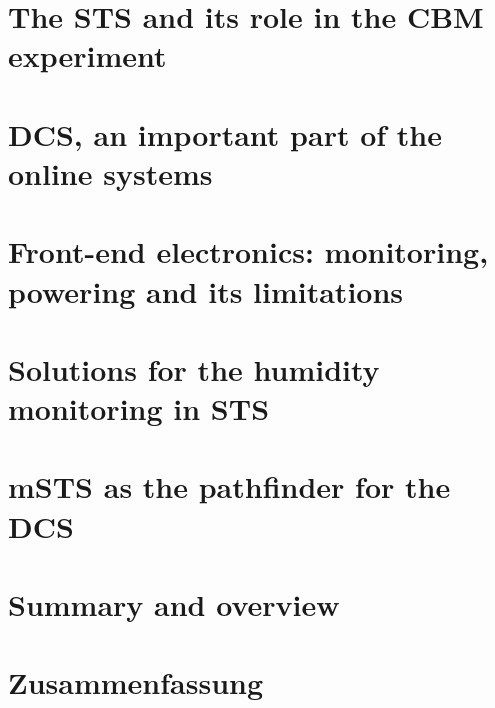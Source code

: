 \chapter{The STS and its role in the CBM experiment}
\label{chap:CBM_STS}

\chapter{DCS, an important part of the online systems}
\label{chap:online_systems}






\chapter{Front-end electronics: monitoring, powering and its limitations}
\label{chap:containers}



\chapter{Solutions for the humidity monitoring in STS}
\label{chap:fos}



\chapter{mSTS as the pathfinder for the DCS}
\label{chap:msts}
        

\chapter{Summary and overview}
\label{chap:last}


%
%
%
\chapter*{Zusammenfassung}

%

\renewcommand\listfigurename{List of Figures}
\listoffigures
{}
\renewcommand\listtablename{List of Tables}
\listoftables

{}
\printbibliography
\printglossaries


